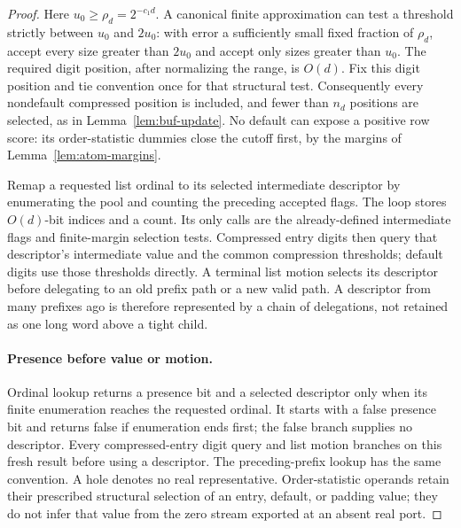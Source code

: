 \begin{proof}
Here $u_0\ge\rho_d=2^{-c_1d}$.  A canonical finite approximation can
test a threshold strictly between $u_0$ and $2u_0$: with error a
sufficiently small fixed fraction of $\rho_d$, accept every size
greater than $2u_0$ and accept only sizes greater than $u_0$.
The required digit position, after normalizing the range, is $O(d)$.
Fix this digit position and tie convention once for that structural test.
Consequently every nondefault compressed position is included, and
fewer than $n_d$ positions are selected, as in
Lemma~\ref{lem:buf-update}.  No default can expose a positive row score: its
order-statistic dummies close the cutoff first, by the margins of
Lemma~\ref{lem:atom-margins}.

Remap a requested list ordinal to its selected intermediate descriptor
by enumerating the pool and counting the preceding accepted flags.
The loop stores $O(d)$-bit indices and a count.  Its only calls are the
already-defined intermediate flags and finite-margin selection tests.
Compressed entry digits then query that descriptor's intermediate value
and the common compression thresholds; default digits use those
thresholds directly.  A terminal list motion selects its descriptor
before delegating to an old prefix path or a new valid path.  A
descriptor from many prefixes ago is therefore represented by a chain
of delegations, not retained as one long word above a tight child.

\paragraph{Presence before value or motion.}
Ordinal lookup returns a presence bit and a selected descriptor only
when its finite enumeration reaches the requested ordinal. It starts
with a false presence bit and returns false if enumeration ends first;
the false branch supplies no descriptor. Every compressed-entry digit
query and list motion branches on this fresh result before using a
descriptor. The preceding-prefix lookup has the same convention.
A hole denotes no real representative. Order-statistic operands retain their
prescribed structural selection of an entry, default, or padding
value; they do not infer that value from the zero stream exported
at an absent real port.


\end{proof}
